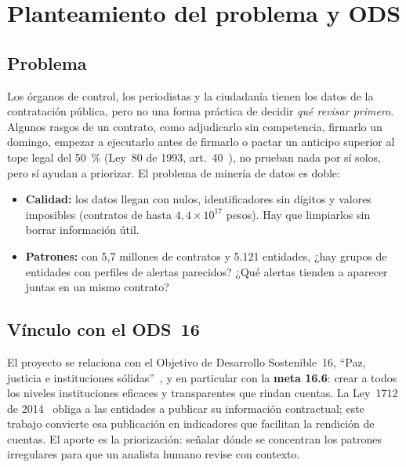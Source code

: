 \documentclass[conference,a4paper]{IEEEtran}
\begin{document}
\section{Planteamiento del problema y ODS}
\subsection{Problema}
Los órganos de control, los periodistas y la ciudadanía tienen los datos de la contratación pública, pero no
una forma práctica de decidir \emph{qué revisar primero}. Algunos rasgos de un contrato, como adjudicarlo sin
competencia, firmarlo un domingo, empezar a ejecutarlo antes de firmarlo o pactar un anticipo superior al tope
legal del 50~\% (Ley~80 de 1993, art.~40~\cite{ley80}), no prueban nada por sí solos, pero sí ayudan a
priorizar. El problema de minería de datos es doble:
\begin{itemize}
  \item \textbf{Calidad:} los datos llegan con nulos, identificadores sin dígitos y valores imposibles (contratos
        de hasta $4{,}4\times10^{17}$ pesos). Hay que limpiarlos sin borrar información útil.
  \item \textbf{Patrones:} con 5,7 millones de contratos y 5.121 entidades, ¿hay grupos de entidades con perfiles
        de alertas parecidos? ¿Qué alertas tienden a aparecer juntas en un mismo contrato?
\end{itemize}

\subsection{Vínculo con el ODS~16}
El proyecto se relaciona con el Objetivo de Desarrollo Sostenible~16, ``Paz, justicia e instituciones
sólidas''~\cite{ods16}, y en particular con la \textbf{meta 16.6}: crear a todos los niveles instituciones
eficaces y transparentes que rindan cuentas. La Ley~1712 de 2014~\cite{ley1712} obliga a las entidades a publicar
su información contractual; este trabajo convierte esa publicación en indicadores que facilitan la rendición de
cuentas. El aporte es la priorización: señalar dónde se concentran los patrones irregulares para que un analista
humano revise con contexto.

\end{document}
